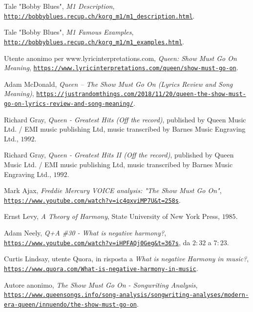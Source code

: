 \documentclass[12pt]{article}
\begin{document}
\begin{thebibliography}{99}
 Tale "Bobby Blues",
 \textit{M1 Description},
 \texttt{\url{http://bobbyblues.recup.ch/korg_m1/m1_description.html}}.

 Tale "Bobby Blues",
 \textit{M1 Famous Examples},
 \texttt{\url{http://bobbyblues.recup.ch/korg_m1/m1_examples.html}}.

 Utente anonimo per www.lyricinterpretations.com,
 \textit{Queen: Show Must Go On Meaning},
 \texttt{\url{https://www.lyricinterpretations.com/queen/show-must-go-on}}.

 Adam McDonald,
 \textit{Queen – The Show Must Go On (Lyrics Review and Song Meaning)},
 \texttt{\url{https://justrandomthings.com/2018/11/20/queen-the-show-must-go-on-lyrics-review-and-song-meaning/}}.

 Richard Gray,
 \textit{Queen - Greatest Hits (Off the record)},
 published by Queen Music Ltd. / EMI music publishing Ltd,
 music transcribed by Barnes Music Engraving Ltd.,
 \(1992\).

 Richard Gray,
 \textit{Queen - Greatest Hits II (Off the record)},
 published by Queen Music Ltd. / EMI music publishing Ltd,
 music transcribed by Barnes Music Engraving Ltd.,
 \(1992\).

 Mark Ajax,
 \textit{Freddie Mercury VOICE analysis: "The Show Must Go On"},
 \texttt{\url{https://www.youtube.com/watch?v=ic4qxviMP7U&t=258s}}.

 Ernst Levy,
 \textit{A Theory of Harmony},
 State University of New York Press,
 \(1985\).

 Adam Neely,
 \textit{Q+A \#30 - What is negative harmony?},
 \texttt{\url{https://www.youtube.com/watch?v=iHPFAQj0Geg&t=367s}},
 da \(2:32\) a \(7:23\).

 Curtis Lindsay, utente Quora, in risposta a
 \textit{What is negative Harmony in music?},
 \texttt{\url{https://www.quora.com/What-is-negative-harmony-in-music}}.

 Autore anonimo,
 \textit{The Show Must Go On - Songwriting Analysis},
 \texttt{\url{https://www.queensongs.info/song-analysis/songwriting-analyses/modern-era-queen/innuendo/the-show-must-go-on}}.

\end{thebibliography}
\end{document}
